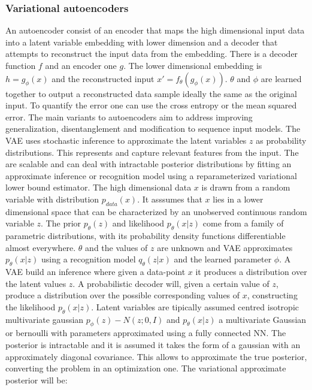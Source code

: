 		\subsubsection{Variational autoencoders}
		An autoencoder consist of an encoder that maps the high dimensional input data into a latent variable embedding with lower dimension and a decoder that attempts to reconstruct the input data from the embedding.
		There is a decoder function $f$ and an encoder one $g$.
		The lower dimensional embedding is $h = g_\phi(x)$ and the reconstructed input $x'=f_\theta(g_\phi(x))$.
		$\theta$ and $\phi$ are learned together to output a reconstructed data sample ideally the same as the original input.
		To quantify the error one can use the cross entropy or the mean squared error.
		The main variants to autoencoders aim to address improving generalization, disentanglement and modification to sequence input models.
		The VAE uses stochastic inference to approximate the latent variables $z$ as probability distributions.
		This represents and capture relevant features from the input.
		The are scalable and can deal with intractable posterior distributions by fitting an approximate inference or recognition model using a reparameterized variational lower bound estimator.
		The high dimensional data $x$ is drawn from a random variable with distribution $p_{data}(x)$.
		It asssumes that $x$ lies in a lower dimensional space that can be characterized by an unobserved continuous random variable $z$.
		The prior $p_\theta(z)$ and likelihood $p_\theta(x|z)$ come from a family of parametric distributions, with its probability density functions differentiable almost everywhere.
		$\theta$ and the values of $z$ are unknown and VAE approximates $p_\theta(x|z)$ using a recognition model $q_\theta(z|x)$ and the learned parameter $\phi$.
		A VAE build an inference where given a data-point $x$ it produces a distribution over the latent values $z$.
		A probabilistic decoder will, given a certain value of $z$, produce a distribution over the possible corresponding values of $x$, constructing the likelihood $p_\theta(x|z)$.
		Latent variables are tipically assumed centred isotropic multivariate gaussian $p_\phi(z) - N(z;0, I)$ and $p_\theta(x|z)$ a multivariate Gaussian or bernoulli with parameters approximated using a fully connected NN.
		The posterior is intractable and it is assumed it takes the form of a gaussian with an approximately diagonal covariance.
		This allows to approximate the true posterior, converting the problem in an optimization one.
		The variational approximate posterior will be:

